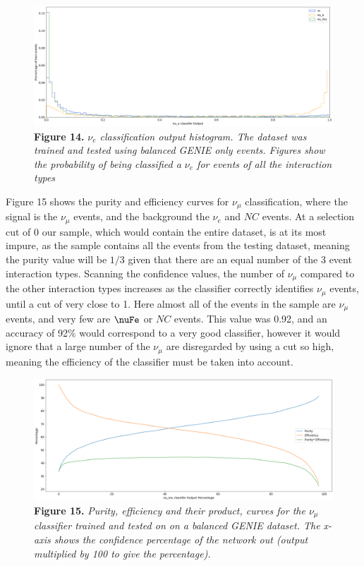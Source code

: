 \begin{figure}[t!]
 \centering
 \includegraphics[width=160mm]{genie/bal_genie/bal_genie_e.png}
 \textbf{Figure 14.} \textit{$\nu_e$ classification output histogram. The dataset was trained and tested using balanced GENIE only events. Figures show the probability of being classified a $\nu_e$ for events of all the interaction types}
\end{figure}

\noindent Figure 15 shows the purity and efficiency curves for $\nu_\mu$ classification, where the signal is the $\nu_\mu$ events, and the background the $\nu_e$ and $NC$ events. At a selection cut of 0 our sample, which would contain the entire dataset, is at its most impure, as the sample contains all the events from the testing dataset, meaning the purity value will be $1/3$ given that there are an equal number of the 3 event interaction types. Scanning the confidence values, the number of $\nu_\mu$ compared to the other interaction types increases as the classifier correctly identifies $\nu_\mu$ events, until a cut of very close to 1. Here almost all of the events in the sample are $\nu_\mu$ events, and very few are $\nuFe$ or $NC$ events. This value was 0.92, and an accuracy of 92\% would correspond to a very good classifier, however it would ignore that a large number of the $\nu_\mu$ are disregarded by using a cut so high, meaning the efficiency of the classifier must be taken into account. \medskip

\begin{figure}[t!]
 \centering
 \includegraphics[width=160mm]{genie/bal_genie/bal_genie_mu_pe.png}
 \textbf{Figure 15.} \textit{Purity, efficiency and their product, curves for the $\nu_\mu$ classifier trained and tested on on a balanced GENIE dataset. The x-axis shows the confidence percentage of the network out (output multiplied by 100 to give the percentage).}
\end{figure}

